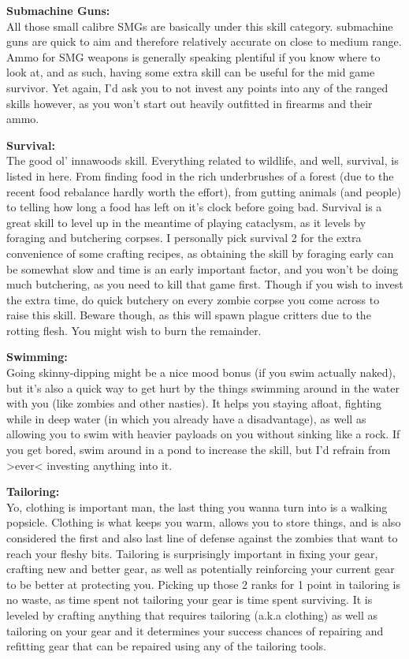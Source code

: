 \textbf{Submachine Guns:}\\All those small calibre SMGs are basically under this skill category. submachine guns are quick to aim and therefore relatively accurate on close to medium range. Ammo for SMG weapons is generally speaking plentiful if you know where to look at, and as such, having some extra skill can be useful for the mid game survivor. Yet again, I'd ask you to not invest any points into any of the ranged skills however, as you won't start out heavily outfitted in firearms and their ammo.

\textbf{Survival:}\\The good ol' innawoods skill. Everything related to wildlife, and well, survival, is listed in here. From finding food in the rich underbrushes of a forest (due to the recent food rebalance hardly worth the effort), from gutting animals (and people) to telling how long a food has left on it's clock before going bad. Survival is a great skill to level up in the meantime of playing cataclysm, as it levels by foraging and butchering corpses. I personally pick survival 2 for the extra convenience of some crafting recipes, as obtaining the skill by foraging early can be somewhat slow and time is an early important factor, and you won't be doing much butchering, as you need to kill that game first. Though if you wish to invest the extra time, do quick butchery on every zombie corpse you come across to raise this skill. Beware though, as this will spawn plague critters due to the rotting flesh. You might wish to burn the remainder.

\textbf{Swimming:}\\Going skinny-dipping might be a nice mood bonus (if you swim actually naked), but it's also a quick way to get hurt by the things swimming around in the water with you (like zombies and other nasties). It helps you staying afloat, fighting while in deep water (in which you already have a disadvantage), as well as allowing you to swim with heavier payloads on you without sinking like a rock. If you get bored, swim around in a pond to increase the skill, but I'd refrain from >ever< investing anything into it.

\textbf{Tailoring:}\\Yo, clothing is important man, the last thing you wanna turn into is a walking popsicle. Clothing is what keeps you warm, allows you to store things, and is also considered the first and also last line of defense against the zombies that want to reach your fleshy bits. Tailoring is surprisingly important in fixing your gear, crafting new and better gear, as well as potentially reinforcing your current gear to be better at protecting you. Picking up those 2 ranks for 1 point in tailoring is no waste, as time spent not tailoring your gear is time spent surviving. It is leveled by crafting anything that requires tailoring (a.k.a clothing) as well as tailoring on your gear and it determines your success chances of repairing and refitting gear that can be repaired using any of the tailoring tools.

